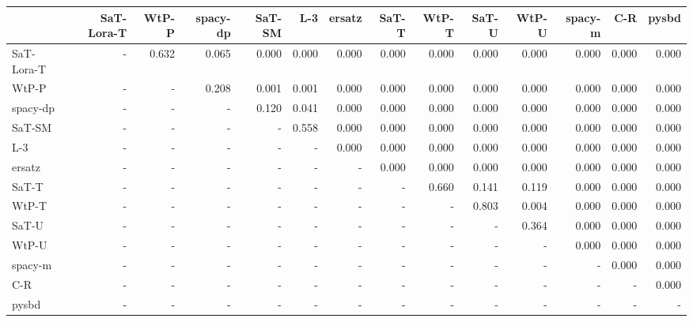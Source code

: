 \begin{tabular}{lrrrrrrrrrrrrr}
\toprule
 & SaT-Lora-T & WtP-P & spacy-dp & SaT-SM & L-3 & ersatz & SaT-T & WtP-T & SaT-U & WtP-U & spacy-m & C-R & pysbd \\
\midrule
SaT-Lora-T & - & 0.632 & 0.065 & 0.000 & 0.000 & 0.000 & 0.000 & 0.000 & 0.000 & 0.000 & 0.000 & 0.000 & 0.000 \\
WtP-P & - & - & 0.208 & 0.001 & 0.001 & 0.000 & 0.000 & 0.000 & 0.000 & 0.000 & 0.000 & 0.000 & 0.000 \\
spacy-dp & - & - & - & 0.120 & 0.041 & 0.000 & 0.000 & 0.000 & 0.000 & 0.000 & 0.000 & 0.000 & 0.000 \\
SaT-SM & - & - & - & - & 0.558 & 0.000 & 0.000 & 0.000 & 0.000 & 0.000 & 0.000 & 0.000 & 0.000 \\
L-3 & - & - & - & - & - & 0.000 & 0.000 & 0.000 & 0.000 & 0.000 & 0.000 & 0.000 & 0.000 \\
ersatz & - & - & - & - & - & - & 0.000 & 0.000 & 0.000 & 0.000 & 0.000 & 0.000 & 0.000 \\
SaT-T & - & - & - & - & - & - & - & 0.660 & 0.141 & 0.119 & 0.000 & 0.000 & 0.000 \\
WtP-T & - & - & - & - & - & - & - & - & 0.803 & 0.004 & 0.000 & 0.000 & 0.000 \\
SaT-U & - & - & - & - & - & - & - & - & - & 0.364 & 0.000 & 0.000 & 0.000 \\
WtP-U & - & - & - & - & - & - & - & - & - & - & 0.000 & 0.000 & 0.000 \\
spacy-m & - & - & - & - & - & - & - & - & - & - & - & 0.000 & 0.000 \\
C-R & - & - & - & - & - & - & - & - & - & - & - & - & 0.000 \\
pysbd & - & - & - & - & - & - & - & - & - & - & - & - & - \\
\bottomrule
\end{tabular}


